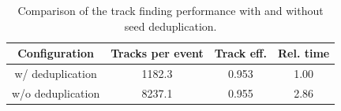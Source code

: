 %

\begin{table}[ht]
    \centering
    \begin{tabular}{cccc}
        \hline
        \textbf{Configuration} & \textbf{Tracks per event} & \textbf{Track eff.} & \textbf{Rel. time} \\
        \hline
        w/ deduplication  & 1182.3 & 0.953 & 1.00 \\
        w/o deduplication & 8237.1 & 0.955 & 2.86 \\
        \hline
    \end{tabular}
    \caption{Comparison of the track finding performance with and without seed deduplication.}
    \label{tab:dev/trackfinding/seed-deduplication}
\end{table}
